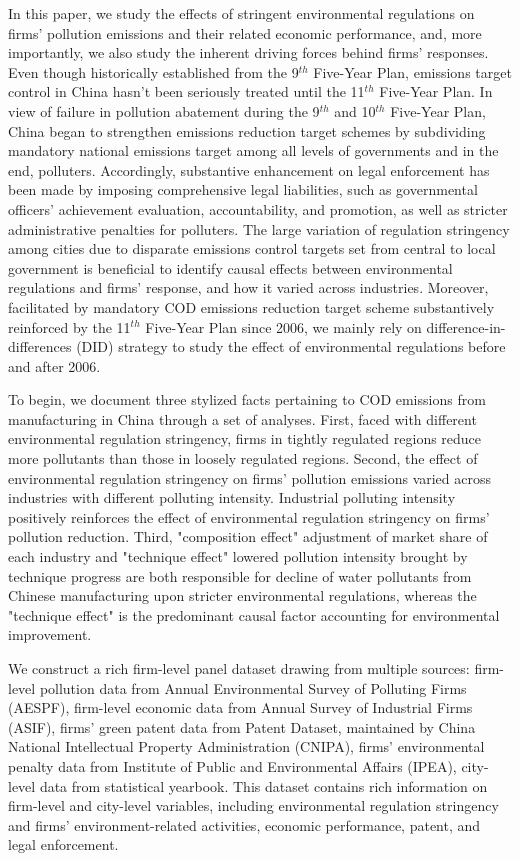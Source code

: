 \documentclass[12pt,english]{article}
\begin{document}
In this paper, we study the effects of stringent environmental regulations on firms' pollution emissions and their related economic performance, and, more importantly, we also study the inherent driving forces behind firms' responses. Even though historically established from the 9$^{th}$ Five-Year Plan, emissions target control in China hasn't been seriously treated until the 11$^{th}$ Five-Year Plan. In view of failure in pollution abatement during the 9$^{th}$ and 10$^{th}$ Five-Year Plan, China began to strengthen emissions reduction target schemes by subdividing mandatory national emissions target among all levels of governments and in the end, polluters. Accordingly, substantive enhancement on legal enforcement has been made by imposing comprehensive legal liabilities, such as governmental officers' achievement evaluation, accountability, and promotion, as well as stricter administrative penalties for polluters. The large variation of regulation stringency among cities due to disparate emissions control targets set from central to local government is beneficial to identify causal effects between environmental regulations and firms' response, and how it varied across industries. Moreover, facilitated by mandatory COD emissions reduction target scheme substantively reinforced by the 11$^{th}$ Five-Year Plan since 2006, we mainly rely on difference-in-differences (DID) strategy to study the effect of environmental regulations before and after 2006.

To begin, we document three stylized facts pertaining to COD emissions from manufacturing in China through a set of analyses. First, faced with different environmental regulation stringency, firms in tightly regulated regions reduce more pollutants than those in loosely regulated regions. Second, the effect of environmental regulation stringency on firms' pollution emissions varied across industries with different polluting intensity. Industrial polluting intensity positively reinforces the effect of environmental regulation stringency on firms' pollution reduction. Third, "composition effect" adjustment of market share of each industry and "technique effect" lowered pollution intensity brought by technique progress are both responsible for decline of water pollutants from Chinese manufacturing upon stricter environmental regulations, whereas the "technique effect" is the predominant causal factor accounting for environmental improvement.

We construct a rich firm-level panel dataset drawing from multiple sources: firm-level pollution data from Annual Environmental Survey of Polluting Firms (AESPF), firm-level economic data from Annual Survey of Industrial Firms (ASIF), firms' green patent data from Patent Dataset, maintained by China National Intellectual Property Administration (CNIPA), firms' environmental penalty data from Institute of Public and Environmental Affairs (IPEA), city-level data from statistical yearbook. This dataset contains rich information on firm-level and city-level variables, including environmental regulation stringency and firms' environment-related activities, economic performance, patent, and legal enforcement.
\end{document}

